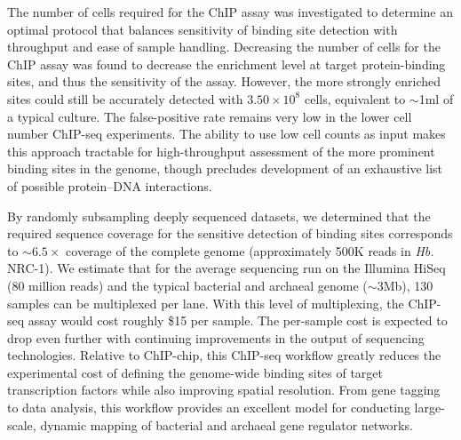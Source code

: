 The number of cells required for the ChIP assay was investigated to determine an optimal protocol that balances sensitivity of binding site detection with throughput and ease of sample handling. Decreasing the number of cells for the ChIP assay was found to decrease the enrichment level at target protein-binding sites, and thus the sensitivity of the assay. However, the more strongly enriched sites could still be accurately detected with $3.50 \times 10^8$ cells, equivalent to $\sim$1ml of a typical culture. The false-positive rate remains very low in the lower cell number ChIP-seq experiments. The ability to use low cell counts as input makes this approach tractable for high-throughput assessment of the more prominent binding sites in the genome, though precludes development of an exhaustive list of possible protein–DNA interactions.

By randomly subsampling deeply sequenced datasets, we determined that the required sequence coverage for the sensitive detection of binding sites corresponds to $\sim 6.5\times$ coverage of the complete genome (approximately 500K reads in {\em Hb.} NRC-1). We estimate that for the average sequencing run on the Illumina HiSeq (80 million reads) and the typical bacterial and archaeal genome ($\sim$3Mb), 130 samples can be multiplexed per lane. With this level of multiplexing, the ChIP-seq assay would cost roughly \$15 per sample. The per-sample cost is expected to drop even further with continuing improvements in the output of sequencing technologies. Relative to ChIP-chip, this ChIP-seq workflow greatly reduces the experimental cost of defining the genome-wide binding sites of target transcription factors while also improving spatial resolution. From gene tagging to data analysis, this workflow provides an excellent model for conducting large-scale, dynamic mapping of bacterial and archaeal gene regulator networks.